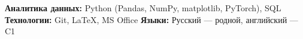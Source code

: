 \vspace{-2mm}


\begin{cvparagraph}
\textbf{Аналитика данных:} Python (Pandas, NumPy, matplotlib, PyTorch), SQL \quad
\textbf{Технологии:} Git, \LaTeX, MS Office \quad
\textbf{Языки:} Русский — родной, английский — C1
\end{cvparagraph}
